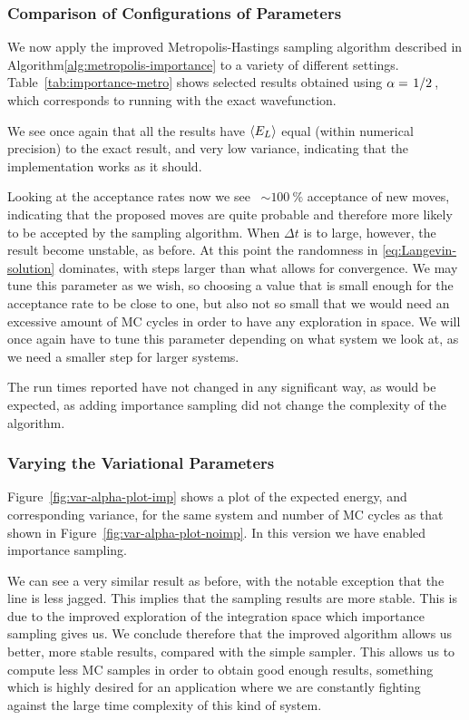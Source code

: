 \documentclass[twocolumn]{article}
\begin{document}
\subsubsection{Comparison of Configurations of Parameters}

We now apply the improved Metropolis-Hastings sampling algorithm described in 
Algorithm\ref{alg:metropolis-importance} to a variety of different settings.
Table~\ref{tab:importance-metro} shows selected results obtained using
$\alpha=\flatfrac{1}{2}$, which corresponds to running with the exact
wavefunction. 

We see once again that all the results have $\expval{E_L}$
equal (within numerical precision) to the exact result, and very low variance,
indicating that the implementation works as it should.

Looking at the acceptance rates now we see ~$\sim\SI{100}{\percent}$ acceptance
of new moves, indicating that the proposed moves are quite probable and
therefore more likely to be accepted by the sampling algorithm. When $\Delta t$
is to large, however, the result become unstable, as before. At this point the
randomness in \eqref{eq:Langevin-solution} dominates, with steps larger than
what allows for convergence. We may tune this parameter as we wish, so choosing
a value that is small enough for the acceptance rate to be close to one, but
also not so small that we would need an excessive amount of MC cycles in order
to have any exploration in space. We will once again have to tune this parameter
depending on what system we look at, as we need a smaller step for larger
systems.

The run times reported have not changed in any significant way, as would be
expected, as adding importance sampling did not change the complexity of the algorithm.


\subsubsection{Varying the Variational Parameters}
Figure~\ref{fig:var-alpha-plot-imp} shows a plot of the expected energy, and
corresponding variance, for the same system and number of MC cycles as that
shown in Figure~\ref{fig:var-alpha-plot-noimp}. In this version we have enabled
importance sampling.

We can see a very similar result as before, with the notable exception that the
line is less jagged. This implies that the sampling results are more stable.
This is due to the improved exploration of the integration space which
importance sampling gives us. We conclude therefore that the improved algorithm
allows us better, more stable results, compared with the simple sampler. This
allows us to compute less MC samples in order to obtain good enough results,
something which is highly desired for an application where we are constantly
fighting against the large time complexity of this kind of system.
\end{document}
